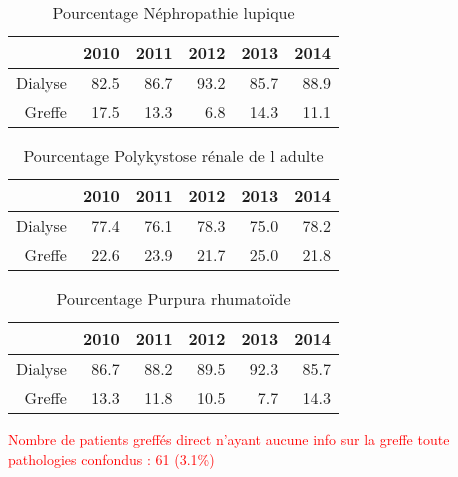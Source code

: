\documentclass[11pt,a4paper]{article}\usepackage[]{graphicx}\usepackage[]{color}
\begin{document}
\begin{table}[H]
\centering
\begin{tabular}{rrrrrr}
  \hline
 & 2010 & 2011 & 2012 & 2013 & 2014 \\ 
  \hline
Dialyse & 82.5 & 86.7 & 93.2 & 85.7 & 88.9 \\ 
  Greffe & 17.5 & 13.3 & 6.8 & 14.3 & 11.1 \\ 
   \hline
\end{tabular}
\caption{Pourcentage Néphropathie lupique} 
\end{table}
\begin{table}[H]
\centering
\begin{tabular}{rrrrrr}
  \hline
 & 2010 & 2011 & 2012 & 2013 & 2014 \\ 
  \hline
Dialyse & 77.4 & 76.1 & 78.3 & 75.0 & 78.2 \\ 
  Greffe & 22.6 & 23.9 & 21.7 & 25.0 & 21.8 \\ 
   \hline
\end{tabular}
\caption{Pourcentage Polykystose rénale de l adulte} 
\end{table}
\begin{table}[H]
\centering
\begin{tabular}{rrrrrr}
  \hline
 & 2010 & 2011 & 2012 & 2013 & 2014 \\ 
  \hline
Dialyse & 86.7 & 88.2 & 89.5 & 92.3 & 85.7 \\ 
  Greffe & 13.3 & 11.8 & 10.5 & 7.7 & 14.3 \\ 
   \hline
\end{tabular}
\caption{Pourcentage Purpura rhumatoïde} 
\end{table}



\textcolor{red}{Nombre de patients greffés direct n'ayant aucune info sur la greffe toute pathologies confondus : 61 (3.1\%)}
~\\


\end{document}
